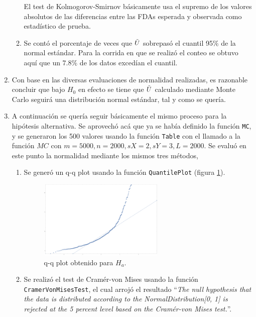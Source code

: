 \documentclass[letter]{article}
\begin{document}
\begin{enumerate}
\begin{enumerate}[label=(\roman*)]
El test de Kolmogorov-Smirnov básicamente usa el supremo de los valores absolutos de las diferencias entre las FDAs esperada y observada como estadístico de prueba.

\item Se contó el porcentaje de veces que $\Tilde{U}$ sobrepasó el cuantil 95\% de la normal estándar. Para la corrida en que se realizó el conteo se obtuvo aquí que un $7.8\%$ de los datos excedían el cuantil.

\end{enumerate}

\item Con base en las diversas evaluaciones de normalidad realizadas, es razonable concluir que bajo $H_0$ en efecto se tiene que $\Tilde{U}$ calculado mediante Monte Carlo seguirá una distribución normal estándar, tal y como se quería.

\item A continuación se quería seguir básicamente el mismo proceso para la hipótesis alternativa. Se aprovechó acá que ya se había definido la función \texttt{MC}, y se generaron los 500 valores usando la función \texttt{Table} con el llamado a la función $MC$ con $m = 5000, n = 2000, sX = 2, sY = 3, L = 2000$. Se evaluó en este punto la normalidad mediante los mismos tres métodos,

\newpage

\begin{enumerate}[label=(\roman*)]

\item Se generó un q-q plot usando la función \texttt{QuantilePlot} (figura \ref{fig:Ha}).

\begin{figure}[h!]
    \centering
    \includegraphics[width=0.6\textwidth]{q-q_Ha.pdf}
    \caption{q-q plot obtenido para $H_a$.}
    \label{fig:Ha}
\end{figure}

\item Se realizó el test de Cramér-von Mises usando la función \texttt{CramerVonMisesTest}, el cual arrojó el resultado ``\emph{The null hypothesis that the data is distributed according to the NormalDistribution[0, 1] is rejected at the 5 percent level based on the Cramér-von Mises test.}''.


\end{enumerate}
\end{enumerate}
\end{document}
